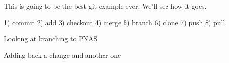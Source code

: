 This is going to be the best git example ever.
We'll see how it goes.

1) commit
2) add
3) checkout
4) merge
5) branch
6) clone
7) push
8) pull

Looking at branching to PNAS

Adding back a change
and another one